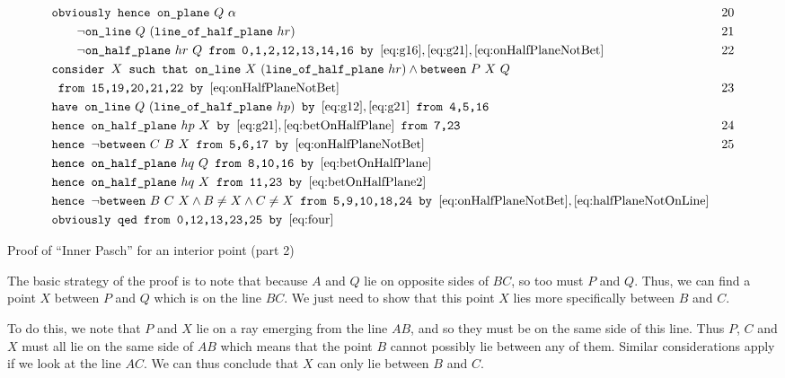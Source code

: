 \begin{boxedfigure}
\small
\begin{align*}
&\texttt{obviously hence } \code{on\_plane}\ Q\ \alpha& 20\\
&\qquad\neg\code{on\_line}\ Q\ (\code{line\_of\_half\_plane}\ hr) & 21\\
&\qquad\neg\code{on\_half\_plane}\ hr\ Q \texttt{ from 0,1,2,12,13,14,16 by } \eqref{eq:g16}, \eqref{eq:g21}, \eqref{eq:onHalfPlaneNotBet}& 22\\
&\texttt{consider } X \texttt{ such that } \code{on\_line}\ X\ (\code{line\_of\_half\_plane}\ hr) \wedge \between{P}{X}{Q}\\
&\texttt{ from 15,19,20,21,22 by } \eqref{eq:onHalfPlaneNotBet} & 23 \\
&\texttt{have } \code{on\_line}\ Q\ (\code{line\_of\_half\_plane}\ hp)\texttt{ by } \eqref{eq:g12}, \eqref{eq:g21} \texttt{ from 4,5,16}\\
&\texttt{hence } \code{on\_half\_plane}\ hp\ X\texttt{ by } \eqref{eq:g21}, \eqref{eq:betOnHalfPlane} \texttt{ from 7,23} & 24\\
&\texttt{hence } \neg\between{C}{B}{X} \texttt{ from 5,6,17 by } \eqref{eq:onHalfPlaneNotBet} & 25\\
&\texttt{hence } \code{on\_half\_plane}\ hq\ Q \texttt{ from 8,10,16 by } \eqref{eq:betOnHalfPlane}\\
&\texttt{hence } \code{on\_half\_plane}\ hq\ X \texttt{ from 11,23 by } \eqref{eq:betOnHalfPlane2}\\
&\texttt{hence } \neg\between{B}{C}{X} \wedge B \neq X \wedge C \neq X\texttt{ from 5,9,10,18,24 by } \eqref{eq:onHalfPlaneNotBet}, \eqref{eq:halfPlaneNotOnLine}\\
&\texttt{obviously qed from 0,12,13,23,25 by } \eqref{eq:four}
\end{align*}
\caption{Proof of ``Inner Pasch'' for an interior point (part 2)}
\label{fig:tricut12}
\end{boxedfigure}

The basic strategy of the proof is to note that because $A$ and $Q$ lie on opposite sides of $BC$, so too must $P$ and $Q$. Thus, we can find a point $X$ between $P$ and $Q$ which is on the line $BC$. We just need to show that this point $X$ lies more specifically between $B$ and $C$.

To do this, we note that $P$ and $X$ lie on a ray emerging from the line $AB$, and so they must be on the same side of this line. Thus $P$, $C$ and $X$ must all lie on the same side of $AB$ which means that the point $B$ cannot possibly lie between any of them. Similar considerations apply if we look at the line $AC$. We can thus conclude that $X$ can only lie between $B$ and $C$.

